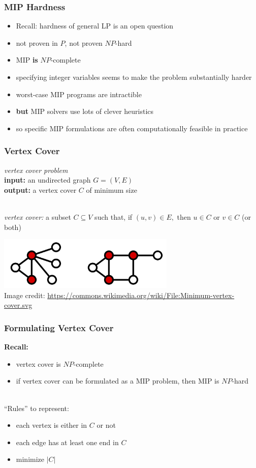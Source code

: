 \documentclass{beamer}
\newcommand{\stanza}{ \\~\ }
\begin{document}
\begin{frame} \frametitle{MIP Hardness}
  \begin{itemize}
  \item Recall: hardness of general LP is an open question
  \item not proven in $P$, not proven $NP$-hard
  \item MIP \textbf{is} $NP$-complete
  \item specifying integer variables seems to make the problem substantially harder
  \item worst-case MIP programs are intractible
  \item \textbf{but} MIP solvers use lots of clever heuristics
  \item so specific MIP formulations are often computationally feasible in practice
  \end{itemize}
\end{frame}

\begin{frame} \frametitle{Vertex Cover}
  \emph{vertex cover problem} \\
  \textbf{input:} an undirected graph $G=(V, E)$ \\
  \textbf{output:} a vertex cover $C$ of minimum size
  \stanza

  \emph{vertex cover:} a subset $C \subseteq V$ such that, if $(u, v) \in E,$ then $u \in C$ or $v \in C$ (or both)
 
  \begin{center}
    \includegraphics[height=1in]{vertex-cover.png} \\
    {\tiny Image credit: \url{https://commons.wikimedia.org/wiki/File:Minimum-vertex-cover.svg} }
  \end{center}

\end{frame}

\begin{frame} \frametitle{Formulating Vertex Cover}
  \textbf{Recall:}
  \begin{itemize}
    \item vertex cover is $NP$-complete
    \item if vertex cover can be formulated as a MIP problem, then MIP is $NP$-hard
    \stanza
  \end{itemize}

  ``Rules'' to represent:
    \begin{itemize}
      \item each vertex is either in $C$ or not
      \item each edge has at least one end in $C$
      \item minimize $|C|$
    \end{itemize}
\end{frame}
\end{document}
